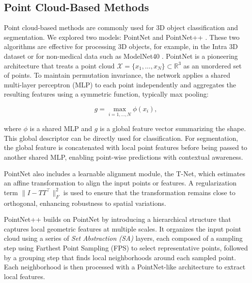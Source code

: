 \documentclass[%
 reprint,
 amsmath,amssymb,
 aps,
 floatfix,
 nofootinbib,
]{revtex4-2}
\begin{document}
\subsection{Point Cloud-Based Methods}

Point cloud-based methods are commonly used for 3D object classification and segmentation. We explored two models: PointNet \citep{pointnet} and PointNet++ \citep{pointnetpp}. These two algorithms are effective for processing 3D objects, for example, in the Intra 3D dataset \citep{yang2020intra} or for non-medical data such as ModelNet40 \citep{7298801}.
PointNet is a pioneering architecture that treats a point cloud \( \mathcal{X} = \{x_1, \dots, x_N\} \subset \mathbb{R}^3 \) as an unordered set of points. To maintain permutation invariance, the network applies a shared multi-layer perceptron (MLP) to each point independently and aggregates the resulting features using a symmetric function, typically max pooling:

\vspace{-0.35cm}

\[
g = \max_{i=1,\dots,N} \phi(x_i),
\]

\vspace{-0.1cm}

where \( \phi \) is a shared MLP and \( g \) is a global feature vector summarizing the shape. This global descriptor can be directly used for classification. For segmentation, the global feature is concatenated with local point features before being passed to another shared MLP, enabling point-wise predictions with contextual awareness.

PointNet also includes a learnable alignment module, the T-Net, which estimates an affine transformation to align the input points or features. A regularization term \( \| I - T T^\top \|_F^2 \) is used to ensure that the transformation remains close to orthogonal, enhancing robustness to spatial variations.

\vspace{0.2cm}

PointNet++ builds on PointNet by introducing a hierarchical structure that captures local geometric features at multiple scales. It organizes the input point cloud using a series of \textit{Set Abstraction (SA)} layers, each composed of a sampling step using Farthest Point Sampling (FPS) to select representative points, followed by a grouping step that finds local neighborhoods around each sampled point. Each neighborhood is then processed with a PointNet-like architecture to extract local features.
\end{document}
